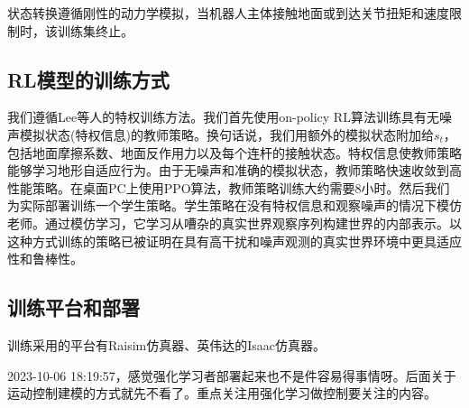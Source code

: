 状态转换遵循刚性的动力学模拟，当机器人主体接触地面或到达关节扭矩和速度限制时，该训练集终止。

\subsection{RL模型的训练方式}

我们遵循Lee等人\cite{Lee_Hwangbo_Wellhausen_Koltun_Hutter_2020}的特权训练方法。我们首先使用on-policy RL算法\cite{Schulman_Wolski_Dhariwal_Radford_Klimov_2017}训练具有无噪声模拟状态(特权信息)的教师策略。换句话说，我们用额外的模拟状态附加给$s_t$，包括地面摩擦系数、地面反作用力以及每个连杆的接触状态。特权信息使教师策略能够学习地形自适应行为。由于无噪声和准确的模拟状态，教师策略快速收敛到高性能策略。在桌面PC上使用PPO算法\cite{Schulman_Wolski_Dhariwal_Radford_Klimov_2017}，教师策略训练大约需要8小时。然后我们为实际部署训练一个学生策略。学生策略在没有特权信息和观察噪声的情况下模仿老师。通过模仿学习\cite{Ross_Gordon_Bagnell_2010}，它学习从嘈杂的真实世界观察序列构建世界的内部表示。以这种方式训练的策略已被证明在具有高干扰和噪声观测的真实世界环境中更具适应性和鲁棒性\cite{Lee_Hwangbo_Wellhausen_Koltun_Hutter_2020}。

\subsection{训练平台和部署}

训练采用的平台有Raisim\cite{Hwangbo_Lee_Hutter_2018, Lee_Bjelonic_Hutter_2023}仿真器、英伟达的Isaac\cite{Rudin_Hoeller_Reist_Hutter_2021}仿真器。

\begin{note}
    2023-10-06 18:19:57，感觉强化学习者部署起来也不是件容易得事情呀。后面关于运动控制建模的方式就先不看了。重点关注用强化学习做控制要关注的内容。
\end{note}